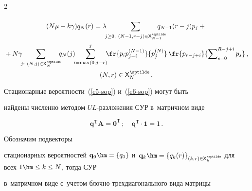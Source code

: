 \begin{multicols}{2}
\begin{multline*}
\end{multline*}



\vspace*{-12pt}



\noindent

\begin{multline*}

(N\mu+k\gamma)q_N(r)=\lambda\hspace*{-4pt}\sum\limits_{j\geq0,\ (N-1,r-j)\in {\sf 

X}^{\sptilde}_{N-1}} \hspace*{-15pt}q_{N-1}(r-j) p_j+{}\\

{}+N\gamma\hspace*{-4pt}\sum\limits_{j:\ (N,j)\in {\sf X}^{\sptilde}_N} \hspace*{-5pt}q_N(j) 

\hspace*{-4pt}\sum\limits^j_{i=\max(0,j-r)}\hspace*{-4pt} \fr{p_i p_{j-i}^{(N-1)}}{p_j^{(N)}}\, 

\fr{p_{r-j+i}}{\sum\nolimits_{s=0}^{R-j+i} p_s}\,,\\

(N,r)\in {\sf X}_N^{\sptilde}\,.


\end{multline*}

  

  Стационарные вероятности~(\ref{e5-sop}) и~(\ref{e6-sop}) могут быть 

найдены численно методом $UL$-раз\-ло\-же\-ния СУР в~матричном виде 

$$

\mathbf{q}^{\mathrm{T}}\mathbf{A}=\mathbf{0}^{\mathrm{T}}\,;

\quad

\mathbf{q}^{\mathrm{T}}\cdot \mathbf{1}=1\,.

$$



 Обозначим подвекторы 

стационарных вероятностей $\mathbf{q}_0\hm=\{q_0\}$ и~$\mathbf{q}_k\hm= 

\{q_k(r)\}_{(k,r)\in {\sf X}_k^{\sptilde}}$ для всех $1\hm\leq k \leq N$, тогда СУР 

в~матричном виде с~учетом блоч\-но-трех\-диа\-го\-наль\-но\-го вида матрицы 


\end{multicols}
